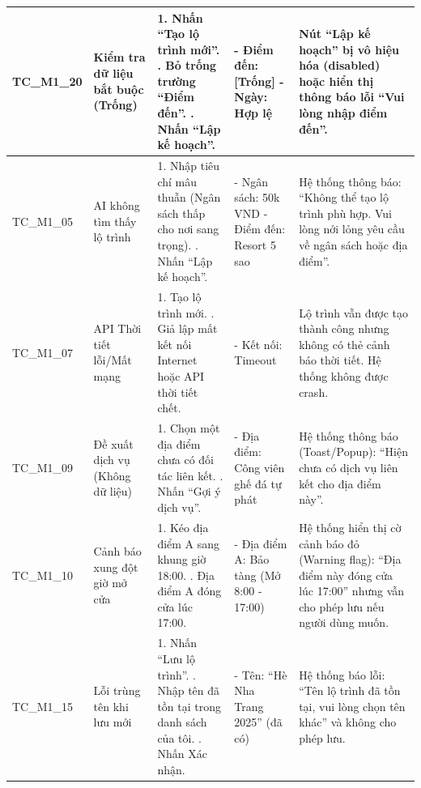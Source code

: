 \begin{landscape}
\begin{longtable}{|p{2.5cm}|p{4.0cm}|p{6.5cm}|p{4.5cm}|p{4.5cm}|}
TC\_M1\_20 & Kiểm tra dữ liệu bắt buộc (Trống) & 
1. Nhấn ``Tạo lộ trình mới''. \newline 
2. Bỏ trống trường ``Điểm đến''. \newline 
3. Nhấn ``Lập kế hoạch''. & 
- Điểm đến: [Trống] \newline
- Ngày: Hợp lệ & 
Nút ``Lập kế hoạch'' bị vô hiệu hóa (disabled) hoặc hiển thị thông báo lỗi ``Vui lòng nhập điểm đến''. \\
\hline

TC\_M1\_05 & AI không tìm thấy lộ trình & 
1. Nhập tiêu chí mâu thuẫn (Ngân sách thấp cho nơi sang trọng). \newline 
2. Nhấn ``Lập kế hoạch''. & 
- Ngân sách: 50k VND \newline 
- Điểm đến: Resort 5 sao & 
Hệ thống thông báo: ``Không thể tạo lộ trình phù hợp. Vui lòng nới lỏng yêu cầu về ngân sách hoặc địa điểm''. \\
\hline

TC\_M1\_07 & API Thời tiết lỗi/Mất mạng & 
1. Tạo lộ trình mới. \newline 
2. Giả lập mất kết nối Internet hoặc API thời tiết chết. & 
- Kết nối: Timeout & 
Lộ trình vẫn được tạo thành công nhưng không có thẻ cảnh báo thời tiết. Hệ thống không được crash. \\
\hline

TC\_M1\_09 & Đề xuất dịch vụ (Không dữ liệu) & 
1. Chọn một địa điểm chưa có đối tác liên kết. \newline 
2. Nhấn ``Gợi ý dịch vụ''. & 
- Địa điểm: Công viên ghế đá tự phát & 
Hệ thống thông báo (Toast/Popup): ``Hiện chưa có dịch vụ liên kết cho địa điểm này''. \\
\hline

TC\_M1\_10 & Cảnh báo xung đột giờ mở cửa & 
1. Kéo địa điểm A sang khung giờ 18:00. \newline 
2. Địa điểm A đóng cửa lúc 17:00. & 
- Địa điểm A: Bảo tàng (Mở 8:00 - 17:00) & 
Hệ thống hiển thị cờ cảnh báo đỏ (Warning flag): ``Địa điểm này đóng cửa lúc 17:00'' nhưng vẫn cho phép lưu nếu người dùng muốn. \\
\hline

TC\_M1\_15 & Lỗi trùng tên khi lưu mới & 
1. Nhấn ``Lưu lộ trình''. \newline 
2. Nhập tên đã tồn tại trong danh sách của tôi. \newline 
3. Nhấn Xác nhận. & 
- Tên: ``Hè Nha Trang 2025'' (đã có) & 
Hệ thống báo lỗi: ``Tên lộ trình đã tồn tại, vui lòng chọn tên khác'' và không cho phép lưu. \\
\hline

\end{longtable}
\end{landscape}